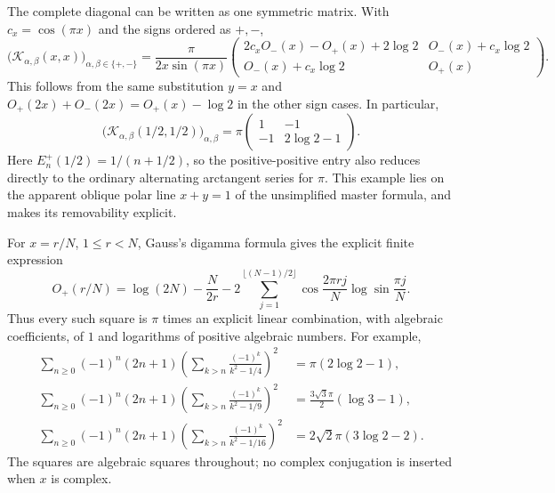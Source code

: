 \documentclass[11pt]{article}
\theoremstyle{definition}
\theoremstyle{remark}
\numberwithin{equation}{section}
\begin{document}
The complete diagonal can be written as one symmetric matrix. With
$c_x=\cos(\pi x)$ and the signs ordered as $+,-$,
\begin{equation}\label{alt:eq:diagonal-matrix}
 \bigl(\mathcal K_{\alpha,\beta}(x,x)\bigr)_{\alpha,\beta\in\{+,-\}}
 =\frac{\pi}{2x\sin(\pi x)}
 \begin{pmatrix}
 2c_xO_-(x)-O_+(x)+2\log2 & O_-(x)+c_x\log2\\
 O_-(x)+c_x\log2 & O_+(x)
 \end{pmatrix}.
\end{equation}
This follows from the same substitution $y=x$ and
$O_+(2x)+O_-(2x)=O_+(x)-\log2$ in the other sign cases.
In particular,
\begin{equation}\label{alt:eq:half-matrix}
 \bigl(\mathcal K_{\alpha,\beta}(1/2,1/2)\bigr)_{\alpha,\beta}
 =\pi\begin{pmatrix}1&-1\\-1&2\log2-1\end{pmatrix}.
\end{equation}
Here $E_n^+(1/2)=1/(n+1/2)$, so the positive-positive entry also
reduces directly to the ordinary alternating arctangent series for
$\pi$. This example lies on the apparent oblique polar line $x+y=1$
of the unsimplified master formula, and makes its removability explicit.

For $x=r/N$, $1\le r<N$, Gauss's digamma formula
\cite[Eq.~(5.4.19)]{DLMFGamma} gives the explicit
finite expression
\begin{equation}\label{alt:eq:rational-O}
 O_+(r/N)=\log(2N)-\frac{N}{2r}
 -2\sum_{j=1}^{\lfloor(N-1)/2\rfloor}
       \cos\frac{2\pi rj}{N}\log\sin\frac{\pi j}{N}.
\end{equation}
Thus every such square is $\pi$ times an explicit linear combination,
with algebraic coefficients, of $1$ and logarithms of positive
algebraic numbers. For example,
\begin{align}
 \sum_{n\ge0}(-1)^n(2n+1)
  \left(\sum_{k>n}\frac{(-1)^k}{k^2-1/4}\right)^2
 &=\pi(2\log2-1),\label{alt:eq:half-example}\\
 \sum_{n\ge0}(-1)^n(2n+1)
  \left(\sum_{k>n}\frac{(-1)^k}{k^2-1/9}\right)^2
 &=\frac{3\sqrt3\pi}{2}(\log3-1),\label{alt:eq:third-example}\\
 \sum_{n\ge0}(-1)^n(2n+1)
  \left(\sum_{k>n}\frac{(-1)^k}{k^2-1/16}\right)^2
 &=2\sqrt2\pi(3\log2-2).\label{alt:eq:quarter-example}
\end{align}
The squares are algebraic squares throughout; no complex conjugation
is inserted when $x$ is complex.
\end{document}
